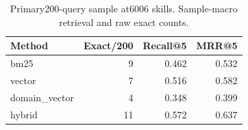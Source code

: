 \begin{table}[t]\centering\small
\begin{tabular}{lrrr}\toprule Method & Exact/200 & Recall@5 & MRR@5\\\midrule
bm25 & 9 & 0.462 & 0.532\\
vector & 7 & 0.516 & 0.582\\
domain\_vector & 4 & 0.348 & 0.399\\
hybrid & 11 & 0.572 & 0.637\\
\bottomrule\end{tabular}\caption{Primary200-query sample at6006 skills. Sample-macro retrieval and raw exact counts.}\end{table}
